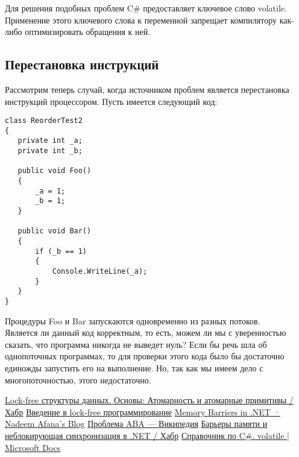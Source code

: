 \documentclass{article}
\begin{document}
Для решения подобных проблем C\# предоставляет ключевое слово volatile. Применение этого ключевого слова к переменной запрещает компилятору как-либо оптимизировать обращения к ней.

\subsection{Перестановка инструкций}

Рассмотрим теперь случай, когда источником проблем является перестановка инструкций процессором.
Пусть имеется следующий код: \\
\begin{lstlisting}
class ReorderTest2
{
   private int _a;
   private int _b;

   public void Foo()
   {
       _a = 1;
       _b = 1;
   }

   public void Bar()
   {
       if (_b == 1)
       {
           Console.WriteLine(_a);
       }
   }
}
\end{lstlisting}

Процедуры Foo и Bar запускаются одновременно из разных потоков. \\

Является ли данный код корректным, то есть, можем ли мы с уверенностью сказать, что программа никогда не выведет нуль? Если бы речь шла об однопоточных программах, то для проверки этого кода было бы достаточно единожды запустить его на выполнение. Но, так как мы имеем дело с многопоточностью, этого недостаточно. 

\newpage

\begin{thebibliography}{9}
 \href{https://habr.com/ru/post/195948/}{Lock-free структуры данных. Основы: Атомарность и атомарные примитивы / Хабр}
 \href{https://habr.com/ru/company/wunderfund/blog/322094/}{Введение в lock-free программирование}
 \href{https://afana.me/archive/2015/07/10/memory-barriers-in-dot-net.aspx/}{Memory Barriers in .NET · Nadeem Afana's Blog}
 \href{https://ru.wikipedia.org/wiki/%D0%9F%D1%80%D0%BE%D0%B1%D0%BB%D0%B5%D0%BC%D0%B0_ABA}{Проблема ABA — Википедия}
 \href{https://habr.com/ru/post/130318/}{Барьеры памяти и неблокирующая синхронизация в .NET / Хабр}
 \href{https://docs.microsoft.com/ru-ru/dotnet/csharp/language-reference/keywords/volatile}{Справочник по C\#. volatile | Microsoft Docs}
\end{thebibliography}
\end{document}
